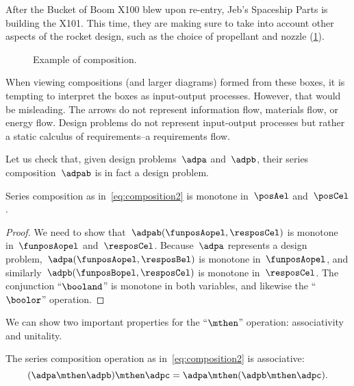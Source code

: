 \begin{example}
    After the Bucket of Boom X100 blew upon re-entry, Jeb's Spaceship Parts is building the X101.
    This time, they are making sure to take into account other aspects of the rocket design, such as the choice of propellant and nozzle (\cref{fig:examplecomposition}).
    \begin{figure}[h!]
        \centering
        \caption{Example of composition. }
        \label{fig:examplecomposition}
    \end{figure}
\end{example}

\begin{remark}
    When viewing compositions (and larger diagrams) formed from these boxes, it is tempting to interpret the boxes as input-output processes.
    However, that would be misleading.
    The arrows do not represent information flow, materials flow, or energy flow.
    Design problems do not represent input-output processes but rather a static calculus of requirements--a requirements flow.
\end{remark}

Let us check that, given design problems~$\adpa$ and~$\adpb$, their series composition~$\adpab$ is in fact a design problem.
\begin{lemma}
    Series composition as in~\cref{eq:composition2} is monotone in~$\posAel$ and~$\posCel$.
\end{lemma}
\begin{proof}
    We need to show that~$\adpab(\funposAopel,\resposCel)$ is monotone in~$\funposAopel$ and~$\resposCel$.
    Because~$\adpa$ represents a design problem,~$\adpa(\funposAopel,\resposBel)$ is monotone in~$\funposAopel$, and similarly~$\adpb(\funposBopel,\resposCel)$ is monotone in~$\resposCel$.
    The conjunction ``$\booland$'' is monotone in both variables, and likewise the ``$\boolor$'' operation.
\end{proof}

We can show two important properties for the ``$\mthen$'' operation: associativity and unitality.
\begin{lemma}
    The series composition operation as in~\cref{eq:composition2} is associative:
    \begin{equation}
    (\adpa\mthen \adpb)
        \mthen \adpc = \adpa\mthen (\adpb\mthen \adpc).
    \end{equation}
\end{lemma}


